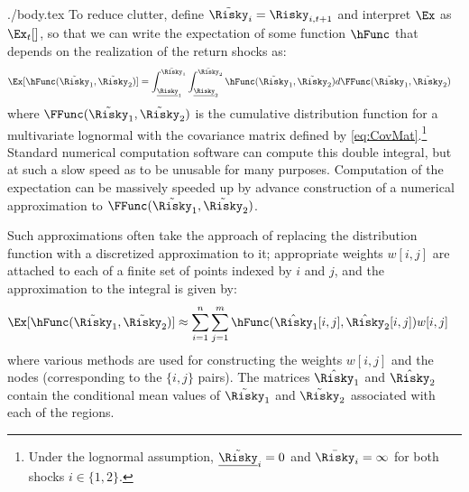 \documentclass{handout}
\begin{document}
\begin{verbatimwrite}{./body.tex}
To reduce clutter, define $\tilde{\Risky}_{i}=\Risky_{i,t+1}$ and interpret $\Ex$ as $\Ex_{t}[]$, so that we can write the expectation of some function $\hFunc$ that depends on the realization of
the return shocks as:
\begin{equation}\begin{gathered}\begin{aligned}
  \Ex[\hFunc(\tilde{\Risky}_{1},\tilde{\Risky}_{2})] & =  \int_{\underline{{\Risky}}_{1}}^{\bar{\Risky}_{1}}\int_{\underline{\Risky}_{2}}^{\bar{\Risky}_{2}} \hFunc(\tilde{\Risky}_{1},\tilde{\Risky}_{2}) d\FFunc(\tilde{\Risky}_{1},\tilde{\Risky}_{2})
\end{aligned}\end{gathered}\end{equation}
where $\FFunc(\tilde{\Risky}_{1},\tilde{\Risky}_{2})$ is the cumulative distribution
function for a multivariate lognormal with the covariance matrix defined by \eqref{eq:CovMat}.\footnote{Under the lognormal assumption, $\underline{\tilde{\Risky}}_{i}=0$ and $\bar{\Risky}_{i}=\infty$ for both shocks $i \in \{1,2\}$.}  Standard numerical computation software can compute this
double integral, but at such a slow speed as to be unusable for many purposes.
Computation of the expectation can be massively speeded up by
advance construction of a numerical approximation to
$\FFunc(\tilde{\Risky}_{1},\tilde{\Risky}_{2})$.

Such approximations often take the approach of replacing the distribution function
with a discretized approximation to it; appropriate weights $w[i,j]$ are attached to
each of a finite set of points indexed by $i$ and $j$, and 
the approximation to the integral is given by:
\begin{equation}\begin{gathered}\begin{aligned}
  \Ex[\hFunc(\tilde{\Risky}_{1},\tilde{\Risky}_{2})] & \approx  \sum_{i=1}^{n}\sum_{j=1}^{m} \hFunc(\hat{\Risky}_{1}[i,j],\hat{\Risky}_{2}[i,j])w[i,j]  \label{eq:wtdAvg}
\end{aligned}\end{gathered}\end{equation}
where various methods are used for constructing the weights $w[i,j]$ and the nodes (corresponding to the $\{i,j\}$ pairs).  The matrices $\hat{\Risky}_{1}$ and $\hat{\Risky}_{2}$ contain the conditional mean values of $\tilde{\Risky}_{1}$ and $\tilde{\Risky}_{2}$ associated with each of the regions.


\end{verbatimwrite}
\end{document}

